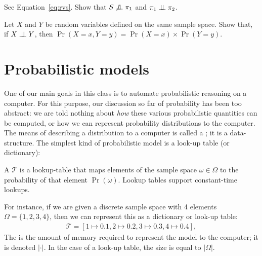 \documentclass{tufte-handout}
\begin{document}
\begin{exercise}[$\star$]
    See Equation~\ref{eq:rvs}. Show that $S \not \perp \!\!\! \perp \pi_1$ and $\pi_1 \perp \!\!\! \perp \pi_2$. 
\end{exercise}

\begin{exercise}[$\star$]
    Let $X$ and $Y$ be random variables defined on the same sample space. Show 
    that, if $X \perp \!\!\! \perp Y$, then $\Pr(X = x, Y = y) = \Pr(X = x) \times \Pr(Y = y)$.
\end{exercise}

\section{Probabilistic models}
One of our main goals in this class is to automate probabilistic reasoning on a
computer.  For this purpose, our discussion so far of probability has been too
abstract: we are told nothing about \emph{how} these various probabilistic
quantities can be computed, or how we can represent probability distributions to
the computer. The means of describing a distribution to a computer is called a
; it is a data-structure. The simplest kind of
probabilistic model is a look-up table (or dictionary):
\begin{definition}
    A  $\mathcal{T}$ is a lookup-table that maps
    elements of the sample space $\omega \in \Omega$ to the probability of that
    element $\Pr(\omega)$. 
    Lookup tables support constant-time lookups.
\end{definition}

For instance, if we are given a discrete sample space with 4 
elements $\Omega = \{1, 2, 3, 4\}$, then we can represent this as 
a dictionary or look-up table:
\begin{align}
    \mathcal{T} = [1 \mapsto 0.1, 2 \mapsto 0.2, 3 \mapsto 0.3, 4 \mapsto 0.4],
\end{align}
The  is the amount of memory required to represent the model to the 
computer; it is denoted $|\cdot|$. In the case of a look-up table, the size is 
equal to $|\Omega|$.
\end{document}
